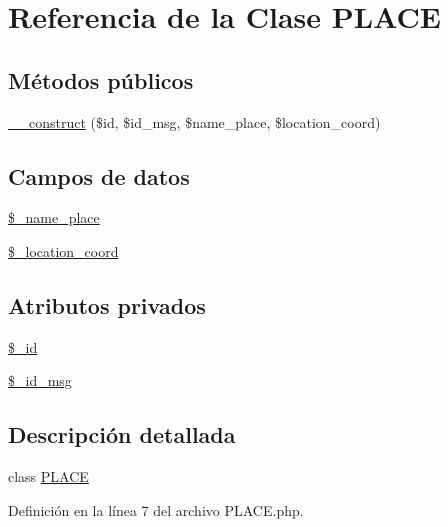 \hypertarget{classPLACE}{\section{Referencia de la Clase P\-L\-A\-C\-E}
\label{classPLACE}
}
\subsection*{Métodos públicos}
\begin{DoxyCompactItemize}
\item 
\hyperlink{classPLACE_aa12a74886b49e2476b79dce3c7c0d91c}{\-\_\-\-\_\-construct} (\$id, \$id\-\_\-msg, \$name\-\_\-place, \$location\-\_\-coord)
\end{DoxyCompactItemize}
\subsection*{Campos de datos}
\begin{DoxyCompactItemize}
\item 
\hyperlink{classPLACE_ab605e159ffb78f4b4cabe8c76dd99775}{\$\-\_\-name\-\_\-place}
\item 
\hyperlink{classPLACE_a1d8307db55f9b8f1b2e1a5730c5d39a3}{\$\-\_\-location\-\_\-coord}
\end{DoxyCompactItemize}
\subsection*{Atributos privados}
\begin{DoxyCompactItemize}
\item 
\hyperlink{classPLACE_a64da16c4a1c7b2dc6784f6ef26341ed7}{\$\-\_\-id}
\item 
\hyperlink{classPLACE_a63808e734406ff8eae9fc3dac25fca22}{\$\-\_\-id\-\_\-msg}
\end{DoxyCompactItemize}


\subsection{Descripción detallada}
class \hyperlink{classPLACE}{P\-L\-A\-C\-E} 

Definición en la línea 7 del archivo P\-L\-A\-C\-E.\-php.



